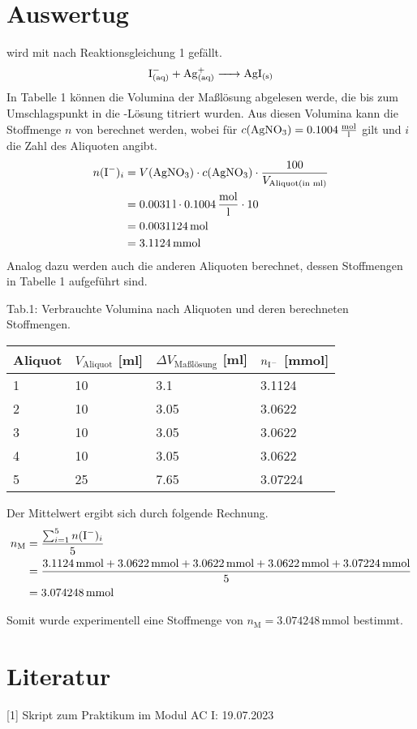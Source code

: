 \documentclass[12pt]{scrartcl} %
\begin{document}
\section{Auswertug}
 wird mit  nach Reaktionsgleichung 1 gefällt.
\begin{equation}
    \ce{I^{-}_{(aq)} + Ag^{+}_{(aq)} -> AgI_{(s)}}
\end{equation}
In Tabelle 1 können die Volumina der Maßlösung abgelesen werde, die bis zum Umschlagspunkt in die -Lösung titriert wurden.
Aus diesen Volumina kann die Stoffmenge $n$ von  berechnet werden, wobei für $c(\ce{AgNO3}) = 0.1004\,\mathrm{\frac{mol}{l}}$ gilt und $i$ die Zahl des Aliquoten angibt.
\begin{align*}
    n(\ce{I^{-}})_i &= V(\ce{AgNO3}) \cdot c(\ce{AgNO3}) \cdot \frac{100}{V_{\mathrm{Aliquot}(\text{in ml})}}\\
    &= 0.0031\,\mathrm{l} \cdot 0.1004\,\mathrm{\frac{mol}{l}} \cdot 10\\
    &= 0.0031124\,\mathrm{mol}\\
    &= 3.1124\,\mathrm{mmol}
\end{align*}
Analog dazu werden auch die anderen Aliquoten berechnet, dessen Stoffmengen in Tabelle 1 aufgeführt sind.\\
\newpage
\begin{center}
    Tab.1: Verbrauchte Volumina nach Aliquoten und deren berechneten Stoffmengen.\\
  \begin{tabular}{l l l l}
      \hline
      Aliquot & $V_{\mathrm{Aliquot}}$ [ml] & $\Delta V_{\text{Maßlösung}}$ [ml] & $n_{\ce{I^{-}}}$ [mmol]\\
      \hline
      1 & 10 & 3.1 & 3.1124\\
      2 & 10 & 3.05 & 3.0622\\
      3 & 10 & 3.05 & 3.0622\\
      4 & 10 & 3.05 & 3.0622\\
      5 & 25 & 7.65 & 3.07224\\
    \hline
  \end{tabular}
\end{center}

Der Mittelwert ergibt sich durch folgende Rechnung.
\begin{align*}
  n_{\mathrm{M}} &= \frac{\sum_{i = 1}^{5} n(\ce{I^{-}})_i}{5}\\
  &= \frac{3.1124\,\mathrm{mmol}+3.0622\,\mathrm{mmol}+3.0622\,\mathrm{mmol}+3.0622\,\mathrm{mmol}+3.07224\,\mathrm{mmol}}{5}\\
  &= 3.074248\,\mathrm{mmol}
\end{align*}

Somit wurde experimentell eine Stoffmenge von $n_{\mathrm{M}} = 3.074248\,\mathrm{mmol}$ bestimmt.

\section{Literatur}
[1] Skript zum Praktikum im Modul AC I: 19.07.2023
\end{document}
